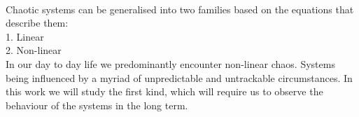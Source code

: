 \paragraph{}
Chaotic systems can be generalised into two families based on the equations that describe them:\\
1. Linear\\
2. Non-linear\\
In our day to day life we predominantly encounter non-linear chaos. Systems being influenced by a myriad of unpredictable
and untrackable circumstances. In this work we will study the first kind, which will require us to observe the behaviour
of the systems in the long term. 

    
